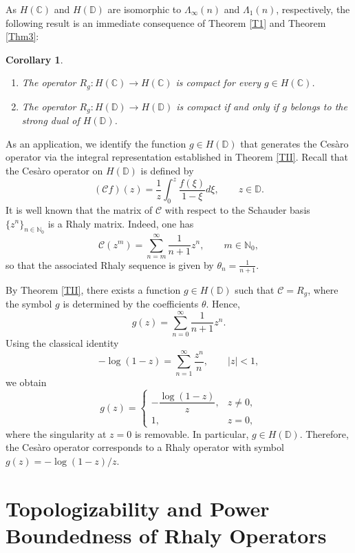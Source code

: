 \documentclass{birkjour}
\newtheorem{cor}[thm]{Corollary}
\theoremstyle{definition}
\theoremstyle{remark}
\numberwithin{equation}{section}
\begin{document}
As $H(\mathbb{C})$ and $H(\mathbb{D})$ are isomorphic to $\Lambda_{\infty}(n)$ and $\Lambda_{1}(n)$, respectively, the following result is an immediate consequence of Theorem \ref{T1} and Theorem \ref{Thm3}:

\begin{cor} \begin{enumerate}
    \item The operator $R_{g}:H(\mathbb{C}) \to H(\mathbb{C})$ is compact for every $g\in H(\mathbb{C})$.
    \item The operator $R_{g}:H(\mathbb{D}) \to H(\mathbb{D})$ is compact if and only if $g$ belongs to the strong dual of $H(\mathbb{D})$.
\end{enumerate} 
\end{cor}

As an application, we identify the function $g\in H(\mathbb{D})$ that 
generates the Ces\`{a}ro operator via the integral representation established 
in Theorem \ref{TII}. Recall that the Ces\`{a}ro operator on $H(\mathbb{D})$ 
is defined by
$$(\mathcal{C}f)(z)=\frac{1}{z}\int^{z}_{0}\frac{f(\xi)}{1-\xi}d\xi, 
\qquad z\in \mathbb{D}.$$
It is well known that the matrix of $\mathcal{C}$ with respect to the Schauder basis $\{z^n\}_{n\in\mathbb{N}_0}$ is a Rhaly matrix. Indeed, one has
\[
\mathcal{C}(z^m)=\sum_{n=m}^{\infty}\frac{1}{n+1}z^n,
\qquad m\in\mathbb{N}_0,
\]
so that the associated Rhaly sequence is given by $\displaystyle \theta_n=\frac{1}{n+1}$.

By Theorem \ref{TII}, there exists a function $g\in H(\mathbb{D})$ such that $\mathcal{C}=R_g$, where the symbol $g$ is determined by the coefficients $\theta$. Hence,
\[
g(z)=\sum_{n=0}^{\infty}\frac{1}{n+1}z^n.
\]
Using the classical identity
\[
-\log(1-z)=\sum_{n=1}^{\infty}\frac{z^n}{n}, \qquad |z|<1,
\]
we obtain
\[
g(z)=
\begin{cases}
-\dfrac{\log(1-z)}{z}, & z\neq 0,\\[6pt]
1, & z=0,
\end{cases}
\]
where the singularity at $z=0$ is removable. In particular, $g\in H(\mathbb{D})$. Therefore, the Ces\`{a}ro operator corresponds to a Rhaly operator with symbol $g(z)=-\log(1-z)/z$.


\section{Topologizability and Power Boundedness of Rhaly Operators}
\end{document}
